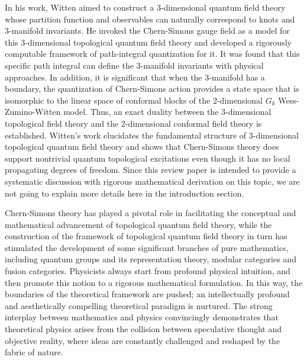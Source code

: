 \par In his work, Witten aimed to construct a 3-dimensional quantum field theory whose partition function and observables can naturally correspond to knots and 3-manifold invariants. He invoked the Chern-Simons gauge field as a model for this 3-dimensional topological quantum field theory and developed a rigorously computable framework of path-integral quantization for it. It was found that this specific path integral can define the 3-manifold invariants with physical approaches. In addition, it is significant that when the 3-manifold has a boundary, the quantization of Chern-Simons action provides a state space that is isomorphic to the linear space of conformal blocks of the 2-dimensional $G_{k}$ Wess-Zumino-Witten model. Thus, an exact duality between the 3-dimensional topological field theory and the 2-dimensional conformal field theory is established. Witten's work elucidates the fundamental structure of 3-dimensional topological quantum field theory and shows that Chern-Simons theory does support nontrivial quantum topological excitations even though it has no local propagating degrees of freedom. Since this review paper is intended to provide a systematic discussion with rigorous mathematical derivation on this topic, we are not going to explain more details here in the introduction section.
\par Chern-Simons theory has played a pivotal role in facilitating the conceptual and mathematical advancement of topological quantum field theory, while the construction of the framework of topological quantum field theory in turn has stimulated the development of some significant branches of pure mathematics, including quantum groups and its representation theory, modular categories and fusion categories. Physicists always start from profound physical intuition, and then promote this notion to a rigorous mathematical formulation. In this way, the boundaries of the theoretical framework are pushed; an intellectually profound and aesthetically compelling theoretical paradigm is nurtured. The strong interplay between mathematics and physics convincingly demonstrates that theoretical physics arises from the collision between speculative thought and objective reality, where ideas are constantly challenged and reshaped by the fabric of nature. 